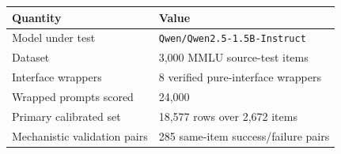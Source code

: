\begin{tabular}{ll}
\toprule
Quantity & Value \\
\midrule
Model under test & \texttt{Qwen/Qwen2.5-1.5B-Instruct} \\
Dataset & 3,000 MMLU source-test items \\
Interface wrappers & 8 verified pure-interface wrappers \\
Wrapped prompts scored & 24,000 \\
Primary calibrated set & 18,577 rows over 2,672 items \\
Mechanistic validation pairs & 285 same-item success/failure pairs \\
\bottomrule
\end{tabular}
